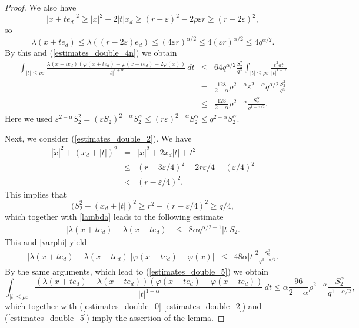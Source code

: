 \documentclass[a4paper,12pt,reqno]{amsart}
\theoremstyle{definition}
\theoremstyle{remark}
\newcommand{\eps}{\varepsilon}
\begin{document}
\begin{proof}
We also have
$$
|x + t e_d|^2 \ge |x|^2 - 2 |t| x_d \ge (r - \eps)^2 - 2 \rho \eps r \ge (r - 2 \eps)^2,
$$
so
$$
\lambda(x + t e_d) \le \lambda((r - 2 \eps) e_d) \le (4 \eps r)^{\alpha/2} \le 4 (\eps r)^{\alpha/2} \le 4 q^{\alpha/2} .
$$
By this and (\ref{estimates_double_4n}) we obtain
\begin{eqnarray}
\nonumber
\int_{|t| \le \rho \eps}
\frac{\lambda(x - t e_d) \left(\varphi(x + t e_d) + \varphi(x - t e_d) - 2 \varphi(x)\right)}{|t|^{1 + \alpha}} \, dt
&\le& 64 q^{\alpha/2} \frac{S_2^2} {q^3} 
\int_{|t| \le \rho \eps} \frac{t^2 dt}{|t|^{1+\alpha}}\\ 
\nonumber
&=& \frac{128}{2 - \alpha} \rho^{2 - \alpha} \eps^{2 - \alpha}  q^{\alpha/2} \frac{S_2^2} {q^3}\\ 
\label{estimates_double_5}
&\le& \frac{128}{2 - \alpha} \rho^{2 - \alpha}  \frac{S_2^\alpha} {q^{1+\alpha/2}}. 
\end{eqnarray}
Here we used $\eps^{2 - \alpha}  S_2^2= (\eps S_2)^{2 - \alpha} {S_2^{\alpha}}\le
 (r\eps)^{2 - \alpha} {S_2^\alpha}\le q^{2 - \alpha} {S_2^\alpha}$.

Next, we consider (\ref{estimates_double_2}). We have
\begin{eqnarray*}
|\tilde{x}|^2 + (x_d + |t|)^2 
&=& |x|^2 + 2 x_d |t| + t^2\\
&\le& (r - 3 \eps/4)^2 + 2 r \eps/4 + (\eps/4)^2\\
&<& (r - \eps/4)^2.
\end{eqnarray*}
This implies that  $$(S^2_2-(x_d+|t|)^2\ge r^2 - (r - \eps/4)^2\ge q/4,$$ which together with \eqref{lambda} leads to the following estimate
\begin{eqnarray*}    
\left| \lambda(x + t e_d) - \lambda(x - t e_d) \right| 
&\le& 8\alpha q^{\alpha/2-1}|t|S_2.\end{eqnarray*}
This and  \eqref{varphi} yield
\begin{eqnarray*}
 \left|\lambda(x + t e_d) - \lambda(x - t e_d)  \right| \left|\varphi(x + t e_d) - \varphi(x) \right|
&\le& 48 \alpha  |t|^2  \frac {S_2^2}{q^{3-\alpha/2}}.
\end{eqnarray*}
By the same arguments, which lead to (\ref{estimates_double_5}) we obtain
\begin{equation*}
\int_{|t| \le \rho \eps}
\frac{\left(\lambda(x + t e_d) - \lambda(x - t e_d)  \right) \left(\varphi(x + t e_d) - \varphi(x - t e_d) \right)}{|t|^{1 + \alpha}} \, dt
\le 
\alpha\frac{96}{2 - \alpha} \rho^{2 - \alpha}  \frac{S_2^\alpha} {q^{1+\alpha/2}}, 
\end{equation*}
which together with (\ref{estimates_double_0}-\ref{estimates_double_2}) and (\ref{estimates_double_5}) imply the assertion of the lemma.
\end{proof}
\end{document}
